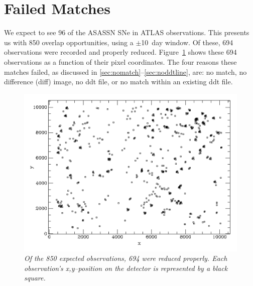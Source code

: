 \section{Failed Matches}\label{sec:failmatch}

We expect to see 96 of the ASASSN SNe in ATLAS observations. 
This presents us with 850 overlap opportunities, using a 
$\pm$10~day window.  Of these, 694 observations were recorded 
and properly reduced.  %
Figure~\ref{fig:xy} shows these 694 observations as a function of their 
pixel coordinates.  
The four reasons these matches failed, as discussed in 
\cref{sec:nomatch}--\cref{sec:noddtline}, are: no match, no difference (diff) 
image, no ddt file, or no match within an existing ddt file.

\begin{figure}[h!]%
\begin{center}
    \includegraphics[width=1\linewidth]{figures/plotxy_694_good_obs.png}%
     \caption{\it \small{Of the 850 expected observations, 694 were reduced properly.  Each observation's x,y--position on the detector is represented by a black square.~\label{fig:xy}}}%
  \end{center}%
\end{figure}


